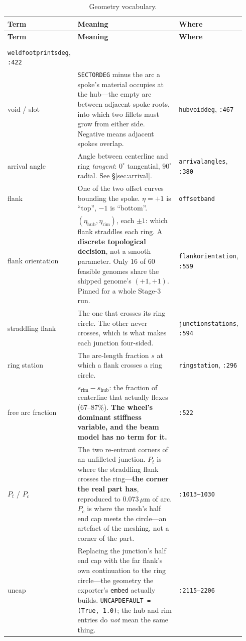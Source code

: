 \documentclass[11pt,a4paper]{article}
\makeatletter
\DeclareRobustCommand{\code}[1]{%
  \texttt{\small\def\_{\textunderscore\discretionary{}{}{}}#1}}
\newenvironment{termtable}[1]
  {\small\begin{longtable}{@{}>{\raggedright\arraybackslash}p{0.19\linewidth}
                             >{\raggedright\arraybackslash}p{0.54\linewidth}
                             >{\raggedright\arraybackslash}p{0.21\linewidth}@{}}
   \caption{#1}\\
   \toprule
   \textbf{Term} & \textbf{Meaning} & \textbf{Where} \\
   \midrule
   \endfirsthead
   \toprule
   \textbf{Term} & \textbf{Meaning} & \textbf{Where} \\
   \midrule
   \endhead
   \midrule
   \multicolumn{3}{r@{}}{\emph{continued on the next page}}\\
   \endfoot
   \bottomrule
   \endlastfoot}
  {\end{longtable}}
\makeatother
\begin{document}
\begin{termtable}{Geometry vocabulary.}
  \code{weld\_footprints\_deg}, \code{:422} \\
\addlinespace
void / slot &
  \code{SECTOR\_DEG} minus the arc a spoke's material occupies at the hub---the empty
  arc between adjacent spoke roots, into which two fillets must grow from either side.
  Negative means adjacent spokes overlap. &
  \code{hub\_void\_deg}, \code{:467} \\
\addlinespace
arrival angle &
  Angle between centerline and ring \emph{tangent}: $0^\circ$ tangential, $90^\circ$
  radial. See \S\ref{sec:arrival}. &
  \code{arrival\_angles}, \code{:380} \\
\addlinespace
flank &
  One of the two offset curves bounding the spoke. $\eta = +1$ is ``top'', $-1$ is
  ``bottom''. &
  \code{offset\_band} \\
\addlinespace
flank orientation &
  $(\eta_{\text{hub}}, \eta_{\text{rim}})$, each $\pm1$: which flank straddles each
  ring. A \textbf{discrete topological decision}, not a smooth parameter. Only 16 of 60
  feasible genomes share the shipped genome's $(+1, +1)$. Pinned for a whole Stage-3
  run. &
  \code{flank\_orientation}, \code{:559} \\
\addlinespace
straddling flank &
  The one that crosses its ring circle. The other never crosses, which is what makes
  each junction four-sided. &
  \code{junction\_stations}, \code{:594} \\
\addlinespace
ring station &
  The arc-length fraction $s$ at which a flank crosses a ring circle. &
  \code{ring\_station}, \code{:296} \\
\addlinespace
free arc fraction &
  $s_{\text{rim}} - s_{\text{hub}}$: the fraction of centerline that actually flexes
  (67--87\%). \textbf{The wheel's dominant stiffness variable, and the beam model has no
  term for it.} &
  \code{:522} \\
\addlinespace
$P_t$ / $P_c$ &
  The two re-entrant corners of an unfilleted junction. $P_t$ is where the straddling
  flank crosses the ring---\textbf{the corner the real part has}, reproduced to
  0.073\,$\mu$m of arc. $P_c$ is where the mesh's half end cap meets the circle---an
  artefact of the meshing, not a corner of the part. &
  \code{:1013--1030} \\
\addlinespace
uncap &
  Replacing the junction's half end cap with the far flank's own continuation to the
  ring circle---the geometry the exporter's \code{\_embed} actually builds.
  \code{UNCAP\_DEFAULT = (True, 1.0)}; the hub and rim entries do \emph{not} mean the
  same thing. &
  \code{:2115--2206} \\

\end{termtable}
\end{document}
